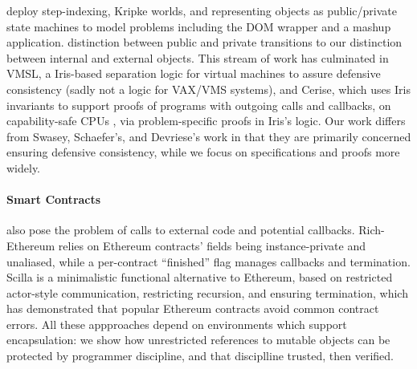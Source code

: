  
\citet{dd} deploy
step-indexing, Kripke worlds, and representing objects
as public/private state machines %
to model 
problems including the 
DOM wrapper and a mashup application.
 distinction
between public and private transitions %
 to our
distinction between internal and external objects.
%
%
This stream of work has culminated in VMSL, a Iris-based separation logic for
virtual machines to assure defensive consistency
\cite{vmsl-pldi2023}
(sadly not a logic for VAX/VMS systems),
%
%
and Cerise, which
uses Iris invariants to support proofs of programs
with outgoing calls and callbacks,
on capability-safe CPUs \cite{cerise-jacm2024},
via
problem-specific proofs in Iris's logic.
%
Our work differs from Swasey, Schaefer's, and Devriese's work in that
they are primarily concerned  %
ensuring defensive consistency, 
while we focus on specifications
and proofs more widely.

\paragraph{Smart Contracts} also pose the problem of calls to external code and potential callbacks.
Rich-Ethereum \cite{rich-specs-smart-contracts-oopsla2021}
relies on Ethereum%
contracts' fields being instance-private
and unaliased, while
a per-contract ``finished'' flag
manages callbacks and termination.
Scilla \cite{sergey-scilla-oopsla2019}
is a minimalistic functional alternative to Ethereum,
based on restricted actor-style
communication, restricting recursion, and ensuring termination,
which has demonstrated that popular Ethereum
contracts avoid common contract errors.
%
All these appproaches depend on
environments which support encapsulation:
we show how unrestricted references to mutable objects can be protected
by programmer discipline,
and that disciplline trusted, then verified.


